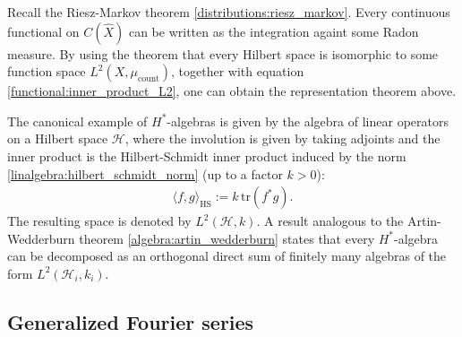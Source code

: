     \begin{remark}
        Recall the Riesz-Markov theorem \ref{distributions:riesz_markov}. Every continuous functional on $C(\widehat{X})$ can be written as the integration againt some Radon measure. By using the theorem that every Hilbert space is isomorphic to some function space $L^2(X,\mu_{\text{count}})$, together with equation \eqref{functional:inner_product_L2}, one can obtain the representation theorem above.
    \end{remark}

    \begin{example}\label{functional:hilbert_schmidt_inner_product}
        The canonical example of $H^*$-algebras is given by the algebra of linear operators on a Hilbert space $\mathcal{H}$, where the involution is given by taking adjoints and the inner product is the Hilbert-Schmidt inner product induced by the norm \ref{linalgebra:hilbert_schmidt_norm} (up to a factor $k>0$):
        \begin{gather}
            \langle f,g \rangle_\mathrm{HS} := k\,\mathrm{tr}(f^*g).
        \end{gather}
        The resulting space is denoted by $L^2(\mathcal{H},k)$. A result analogous to the Artin-Wedderburn theorem \ref{algebra:artin_wedderburn} states that every $H^*$-algebra can be decomposed as an orthogonal direct sum of finitely many algebras of the form $L^2(\mathcal{H}_i,k_i)$.
    \end{example}

\subsection{Generalized Fourier series}

